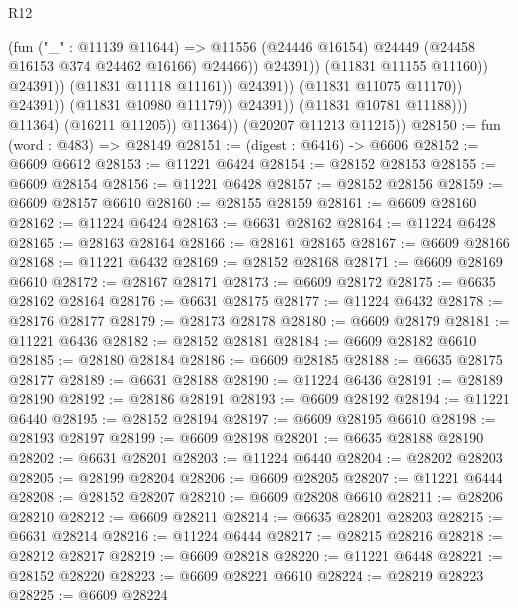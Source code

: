 \begin{lexlean}{R12}
\begin{coremodule}
                                                (fun ("_" : @11139 @11644) =>
                                                @11556
                                                  (@24446 @16154)
                                                  @24449
                                                  (@24458 @16153 @374 @24462 @16166)
                                                  @24466))
                                              @24391))
                                          (@11831 @11155 @11160))
                                        @24391))
                                    (@11831 @11118 @11161))
                                  @24391))
                              (@11831 @11075 @11170))
                            @24391))
                        (@11831 @10980 @11179))
                      @24391))
                  (@11831 @10781 @11188)))
              @11364)
            (@16211 @11205))
          @11364))
      (@20207 @11213 @11215))
@28150 := fun (word : @483) => @28149
@28151 := (digest : @6416) -> @6606
@28152 := @6609 @6612
@28153 := @11221 @6424
@28154 := @28152 @28153
@28155 := @6609 @28154
@28156 := @11221 @6428
@28157 := @28152 @28156
@28159 := @6609 @28157 @6610
@28160 := @28155 @28159
@28161 := @6609 @28160
@28162 := @11224 @6424
@28163 := @6631 @28162
@28164 := @11224 @6428
@28165 := @28163 @28164
@28166 := @28161 @28165
@28167 := @6609 @28166
@28168 := @11221 @6432
@28169 := @28152 @28168
@28171 := @6609 @28169 @6610
@28172 := @28167 @28171
@28173 := @6609 @28172
@28175 := @6635 @28162 @28164
@28176 := @6631 @28175
@28177 := @11224 @6432
@28178 := @28176 @28177
@28179 := @28173 @28178
@28180 := @6609 @28179
@28181 := @11221 @6436
@28182 := @28152 @28181
@28184 := @6609 @28182 @6610
@28185 := @28180 @28184
@28186 := @6609 @28185
@28188 := @6635 @28175 @28177
@28189 := @6631 @28188
@28190 := @11224 @6436
@28191 := @28189 @28190
@28192 := @28186 @28191
@28193 := @6609 @28192
@28194 := @11221 @6440
@28195 := @28152 @28194
@28197 := @6609 @28195 @6610
@28198 := @28193 @28197
@28199 := @6609 @28198
@28201 := @6635 @28188 @28190
@28202 := @6631 @28201
@28203 := @11224 @6440
@28204 := @28202 @28203
@28205 := @28199 @28204
@28206 := @6609 @28205
@28207 := @11221 @6444
@28208 := @28152 @28207
@28210 := @6609 @28208 @6610
@28211 := @28206 @28210
@28212 := @6609 @28211
@28214 := @6635 @28201 @28203
@28215 := @6631 @28214
@28216 := @11224 @6444
@28217 := @28215 @28216
@28218 := @28212 @28217
@28219 := @6609 @28218
@28220 := @11221 @6448
@28221 := @28152 @28220
@28223 := @6609 @28221 @6610
@28224 := @28219 @28223
@28225 := @6609 @28224

\end{coremodule}
\end{lexlean}
